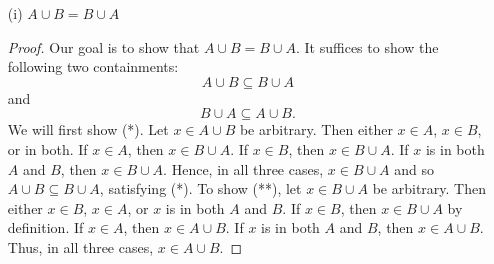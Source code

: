 \documentclass[a4paper]{article}
\begin{document}
\begin{enumerate}
    \item[(i)]  \( A \cup B = B \cup A  \)
        \begin{proof}
        Our goal is to show that \( A \cup B = B \cup A  \). It suffices to show the following two containments:
        \[  A \cup B \subseteq  B \cup A \tag{*}  \]
        and
        \[  B \cup A \subseteq  A \cup B. \tag{**} \]
        We will first show (*). Let \( x \in A \cup B  \) be arbitrary. Then either \( x \in A  \), \( x \in B  \), or in both. If \( x \in A  \), then \( x \in B \cup A  \). If \( x \in B  \), then \( x \in B \cup A  \). If \( x  \) is in both \( A  \) and \( B  \), then \( x \in B \cup A  \). Hence, in all three cases, \( x \in B \cup A  \) and so \( A \cup B \subseteq  B \cup A  \), satisfying (*). To show (**), let \( x \in B \cup A  \) be arbitrary. Then either \( x \in B  \), \( x \in A  \), or \( x  \) is in both \( A  \) and \( B  \). If \( x \in B  \), then \( x \in B \cup A  \) by definition. If \( x \in A   \), then \( x \in A \cup  B \). If \( x  \) is in both \( A  \) and \( B  \), then \( x \in A \cup B \). Thus, in all three cases, \( x \in A \cup B \).


\end{proof}
\end{enumerate}
\end{document}

